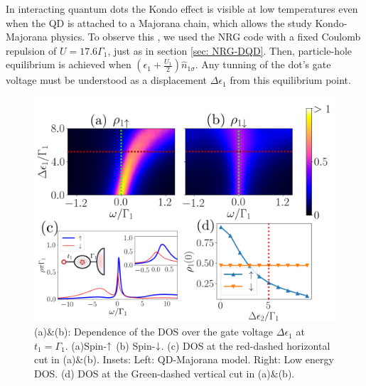 In interacting quantum dots the Kondo effect is visible at low temperatures even when the QD is attached to a Majorana chain, which allows the study Kondo-Majorana physics. To observe this , we used the NRG code with a fixed Coulomb repulsion of $U = 17.6\Gamma_1$, just as in section \ref{sec: NRG-DQD}. Then, particle-hole equilibrium is achieved when $\left(\epsilon_{1}+\frac{U_1}{2}\right)\hat{n}_{1\sigma}$. Any tunning of the dot's gate voltage must be understood as a displacement $\Delta \epsilon_1$ from this equilibrium point. 




 \begin{figure}[h]
 \centering
   \includegraphics[scale=0.57]{IMAGES/Majorana/NRG-FullED.png}
   \caption{ \label{fig:QD-ed}(a)\&(b): Dependence of the DOS over the gate voltage $\Delta \epsilon_1$ at $t_1 = \Gamma_1$. (a)Spin-$\uparrow$ (b) Spin-$\downarrow$. (c) DOS at the red-dashed horizontal cut in (a)\&(b). Insets: Left: QD-Majorana model. Right: Low energy DOS. (d) DOS at the Green-dashed vertical cut in (a)\&(b). \protect{} }
 \end{figure}



